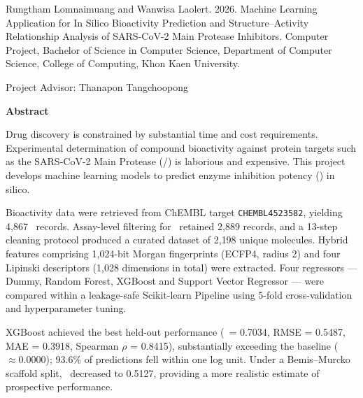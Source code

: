 \clearpage
{}
{}

\begin{flushleft}
\linespread{1.15}\selectfont
\noindent Rungtham Lomnaimuang and Wanwisa Laolert. 2026. Machine Learning Application for In Silico Bioactivity Prediction and Structure--Activity Relationship Analysis of SARS-CoV-2 Main Protease Inhibitors. Computer Project, Bachelor of Science in Computer Science, Department of Computer Science, College of Computing, Khon Kaen University.\par
\vspace{0.3cm}
\noindent Project Advisor: Thanapon Tangchoopong\par
\end{flushleft}

\vspace{0.6cm}
\begin{center}
{\large\bfseries Abstract\par}
\end{center}
\vspace{0.3cm}

Drug discovery is constrained by substantial time and cost requirements. Experimental determination of compound bioactivity against protein targets such as the SARS-CoV-2 Main Protease (\Mpro/\CLpro) is laborious and expensive. This project develops machine learning models to predict enzyme inhibition potency (\pICfifty) in silico.

Bioactivity data were retrieved from ChEMBL target \texttt{CHEMBL4523582}, yielding 4{,}867 \ICfifty\ records. Assay-level filtering for \CLpro\ retained 2{,}889 records, and a 13-step cleaning protocol produced a curated dataset of 2{,}198 unique molecules. Hybrid features comprising 1{,}024-bit Morgan fingerprints (ECFP4, radius 2) and four Lipinski descriptors (1{,}028 dimensions in total) were extracted. Four regressors --- Dummy, Random Forest, XGBoost and Support Vector Regressor --- were compared within a leakage-safe Scikit-learn Pipeline using 5-fold cross-validation and hyperparameter tuning.

XGBoost achieved the best held-out performance (\Rsq\ = 0.7034, RMSE = 0.5487, MAE = 0.3918, Spearman $\rho$ = 0.8415), substantially exceeding the baseline (\Rsq\ $\approx 0.0000$); 93.6\% of predictions fell within one log unit. Under a Bemis--Murcko scaffold split, \Rsq\ decreased to 0.5127, providing a more realistic estimate of prospective performance.

